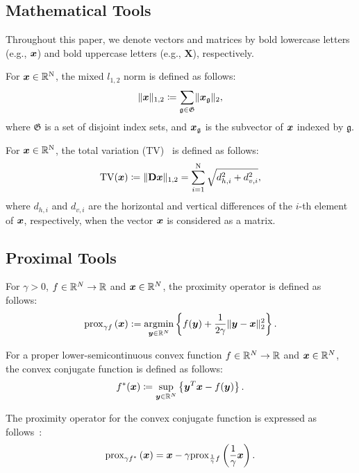 \subsection{Mathematical Tools}\label{subsec:mathematical-tools}

Throughout this paper, we denote vectors and matrices by bold lowercase letters (e.g., $\bm{x}$) and bold uppercase letters (e.g., $\bm{X}$), respectively.

For $\bm{x} \in \mathbb{R}^{\mathrm{N}}$, the mixed $l_{1,2}$ norm is defined as follows:
\begin{equation} \label{eq:L12NormDefinitionEq} \lVert \bm{x} \rVert _{1,2} \coloneq \sum_{\mathfrak{g} \in \mathfrak{G}} \lVert \bm{x}_\mathfrak{g} \rVert _2, \end{equation}
where $\mathfrak{G}$ is a set of disjoint index sets, and $\bm{x}_{\mathfrak{g}}$ is the subvector of $\bm{x}$ indexed by $\mathfrak{g}$.

For $\bm{x} \in \mathbb{R}^{\mathrm{N}}$, the total variation (TV)~\cite{TV} is defined as follows:
\begin{equation} \label{eq:TVDefinitionEq} \mathrm{TV}(\bm{x}) \coloneq \lVert \mathbf{D} \bm{x} \rVert _{1,2} = \sum_{i=1}^{\mathrm{N}} \sqrt{d_{h,i}^2 + d_{v,i}^2}, \end{equation}
where $d_{h,i}$ and $d_{v,i}$ are the horizontal and vertical differences of the $i$-th element of $\bm{x}$, respectively, when the vector $\bm{x}$ is considered as a matrix.

\subsection{Proximal Tools}\label{subsec:proximal-tools}
For $\gamma > 0$, $f \in \mathbb{R}^N \to \mathbb{R}$ and $\bm{x} \in \mathbb{R}^N$, the proximity operator is defined as follows:
\begin{equation} \label{eq:ProximityOperatorDefinitionEq} \mathrm{prox}_{ \gamma f }\left(\bm{x}\right) := \underset{\bm{y} \in \mathbb{R}^N}{\mathrm{argmin}} \left\{ f(\bm{y}) + \frac{1}{2 \gamma} \lVert \bm{y} - \bm{x} \rVert _2^2 \right\}. \end{equation}

For a proper lower-semicontinuous convex function $f \in \mathbb{R}^N \to \mathbb{R}$ and $\bm{x} \in \mathbb{R}^N$, the convex conjugate function is defined as follows:
\begin{equation} \label{eq:ConjugateFunctionDefinitionEq} f^*(\bm{x}) \coloneq \sup_{\bm{y} \in \mathbb{R}^N} \left\{ \bm{y}^T \bm{x} - f(\bm{y}) \right\}. \end{equation}

The proximity operator for the convex conjugate function is expressed as follows~\cite[Theorem 3.1 (ii)]{prox-convex-conjugate-function}:
\begin{equation} \label{eq:ProximityOperatorDefinitionWithConvexConjugateFunctionEq} \mathrm{prox}_{ \gamma f^* }\left(\bm{x}\right) = \bm{x} - \gamma \mathrm{prox}_{ \frac 1 \gamma f }\left(\frac 1 \gamma \bm{x}\right). \end{equation}

